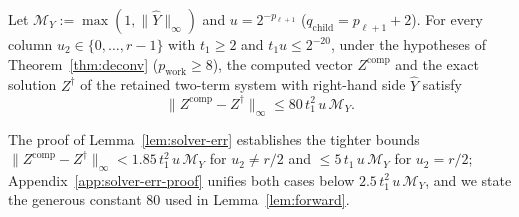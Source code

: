 \begin{lemma}\label{lem:solver-err}
Let $\mathcal{M}_Y := \max(1, \|\widehat{Y}\|_\infty)$ and $u = 2^{-p_{\ell+1}}$ ($q_{\mathrm{child}} = p_{\ell+1} + 2$). For every column $u_2 \in \{0, \dots, r-1\}$ with $t_1 \ge 2$ and $t_1 u \le 2^{-20}$, under the hypotheses of Theorem~\ref{thm:deconv} ($p_{\mathrm{work}} \ge 8$), the computed vector $Z^{\mathrm{comp}}$ and the exact solution $Z^\dagger$ of the retained two-term system with right-hand side $\widehat{Y}$ satisfy
\begin{equation}\label{eq:solver-err}
  \|Z^{\mathrm{comp}} - Z^\dagger\|_\infty \le 80 \, t_1^2 \, u \, \mathcal{M}_Y.
\end{equation}
\end{lemma}

The proof of Lemma~\ref{lem:solver-err} establishes the tighter bounds $\|Z^{\mathrm{comp}} - Z^\dagger\|_\infty < 1.85 \, t_1^2 \, u \, \mathcal{M}_Y$ for $u_2 \ne r/2$ and $\le 5 \, t_1 \, u \, \mathcal{M}_Y$ for $u_2 = r/2$; Appendix~\ref{app:solver-err-proof} unifies both cases below $2.5\,t_1^2\,u\,\mathcal{M}_Y$, and we state the generous constant $80$ used in Lemma~\ref{lem:forward}.
